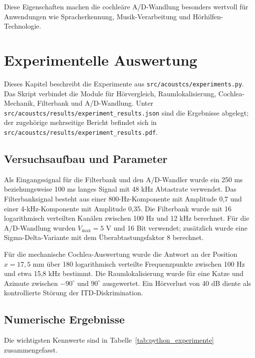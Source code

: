 ﻿\documentclass[12pt, a4paper]{article}
\theoremstyle{definition}
\theoremstyle{remark}
\begin{document}
Diese Eigenschaften machen die cochleäre A/D-Wandlung besonders wertvoll für 
Anwendungen wie Spracherkennung, Musik-Verarbeitung und Hörhilfen-Technologie.


\section{Experimentelle Auswertung}
\label{sec:experimentelle_auswertung}
Dieses Kapitel beschreibt die Experimente aus
\texttt{src/acoustcs/experiments.py}. Das Skript verbindet die Module für
Hörvergleich, Raumlokalisierung, Cochlea-Mechanik, Filterbank und A/D-Wandlung.
Unter \texttt{src/acoustcs/results/experiment\_results.json} sind die Ergebnisse abgelegt; der zugehörige
mehrseitige Bericht befindet sich in \texttt{src/acoustcs/results/experiment\_results.pdf}.

\subsection{Versuchsaufbau und Parameter}
Als Eingangssignal für die Filterbank und den A/D-Wandler wurde ein 250 ms
beziehungsweise 100 ms langes Signal mit 48 kHz Abtastrate verwendet. Das
Filterbanksignal besteht aus einer 800-Hz-Komponente mit Amplitude 0,7 und
einer 4-kHz-Komponente mit Amplitude 0,35. Die Filterbank wurde mit 16
logarithmisch verteilten Kanälen zwischen 100 Hz und 12 kHz berechnet.
Für die A/D-Wandlung wurden $V_{\max}=5$ V und 16 Bit verwendet; zusätzlich
wurde eine Sigma-Delta-Variante mit dem Überabtastungsfaktor 8 berechnet.

Für die mechanische Cochlea-Auswertung wurde die Antwort an der Position
$x=17{,}5$ mm über 180 logarithmisch verteilte Frequenzpunkte zwischen 100 Hz
und etwa 15,8 kHz bestimmt. Die Raumlokalisierung wurde für eine Katze und
Azimute zwischen $-90^\circ$ und $90^\circ$ ausgewertet. Ein Hörverlust von
40 dB diente als kontrollierte Störung der ITD-Diskrimination.

\subsection{Numerische Ergebnisse}
Die wichtigsten Kennwerte sind in Tabelle~\ref{tab:python_experimente}
zusammengefasst.
\end{document}
